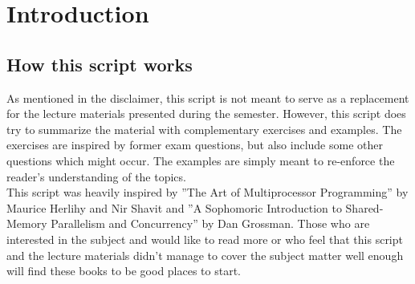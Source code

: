 \documentclass[main]{subfiles}
\begin{document}
\section{Introduction}
\subsection{How this script works}
As mentioned in the disclaimer, this script is not meant to serve as a replacement for the lecture materials presented during the semester. However, this script does try to summarize the material with complementary exercises and examples. The exercises are inspired by former exam questions, but also include some other questions which might occur. The examples are simply meant to re-enforce the reader's understanding of the topics.\\[3mm]
This script was heavily inspired by ''The Art of Multiprocessor Programming'' by Maurice Herlihy and Nir Shavit and ''A Sophomoric Introduction to Shared-Memory Parallelism and Concurrency'' by Dan Grossman. Those who are interested in the subject and would like to read more or who feel that this script and the lecture materials didn't manage to cover the subject matter well enough will find these books to be good places to start.
\end{document}
